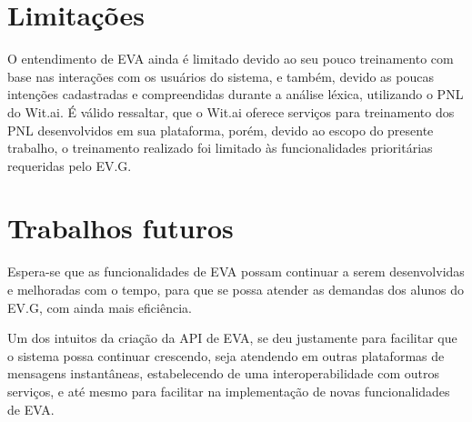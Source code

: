 \section{Limitações}

O entendimento de EVA ainda é limitado devido ao seu pouco treinamento com base nas interações com os usuários do sistema, e também, devido as poucas intenções cadastradas e compreendidas durante a análise léxica, utilizando o PNL do Wit.ai. É válido ressaltar, que o Wit.ai oferece serviços para treinamento dos PNL desenvolvidos em sua plataforma, porém, devido ao escopo do presente trabalho, o treinamento realizado foi limitado às funcionalidades prioritárias requeridas pelo EV.G.

\section{Trabalhos futuros}

Espera-se que as funcionalidades de EVA possam continuar a serem desenvolvidas e melhoradas com o tempo, para que se possa atender as demandas dos alunos do EV.G, com ainda mais eficiência.

Um dos intuitos da criação da API de EVA, se deu justamente para facilitar que o sistema possa continuar crescendo, seja atendendo em outras plataformas de mensagens instantâneas, estabelecendo de uma interoperabilidade com outros serviços, e até mesmo para facilitar na implementação de novas funcionalidades de EVA. 